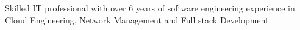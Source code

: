 \documentclass[letter,10pt]{article}
\begin{document}

Skilled IT professional with over 6 years of software engineering experience in Cloud Engineering, Network Management and Full stack Development.
\end{document}
